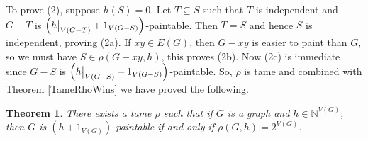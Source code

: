 \documentclass[12pt]{article}
\theoremstyle{plain}
\newtheorem{thm}{Theorem}[section]
\theoremstyle{definition}
\theoremstyle{remark}
\newcommand{\IN}{\mathbb{N}}
\newcommand{\parens}[1]{\left( #1 \right)}
\newcommand\restr[2]{{%
  \left.\kern-\nulldelimiterspace %
  #1 %
  \vphantom{\big|} %
  \right|_{#2} %
  }}
\begin{document}
To prove (2), suppose $h(S) = 0$.  Let $T \subseteq S$ such that $T$ is independent and $G-T$ is $\parens{\restr{h}{V(G-T)} + 1_{V(G-S)}}$-paintable.  Then $T=S$ and hence $S$ is independent, proving (2a).  If $xy \in E(G)$, then $G-xy$ is easier to paint than $G$, so we must have $S \in \rho(G-xy, h)$, this proves (2b).  Now (2c) is immediate since $G-S$ is $\parens{\restr{h}{V(G-S)} + 1_{V(G-S)}}$-paintable.  So, $\rho$ is tame and combined with Theorem \ref{TameRhoWins} we have proved the following.

\begin{thm}
	There exists a tame $\rho$ such that if $G$ is a graph and $h \in \IN^{V(G)}$, then $G$ is $(h + 1_{V(G)})$-paintable if and only if $\rho(G, h) = 2^{V(G)}$.
\end{thm}



\end{document}
